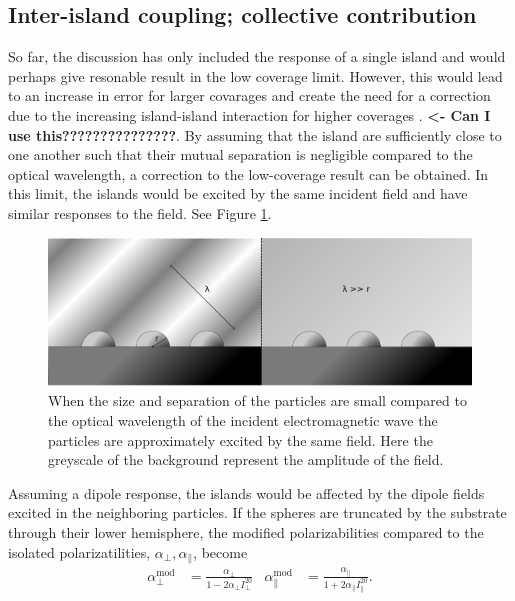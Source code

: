 \subsection{Inter-island coupling; collective contribution}
So far, the discussion has only included the response of a single island and would perhaps 
give resonable result in the low coverage limit. However, this would lead to 
an increase in error for larger covarages and create the need for a correction
due to the increasing island-island interaction for higher coverages
\cite[p.~20]{Lie2010}.
%
\textbf{ <- Can I use this???????????????}.%
%
By assuming that the island are sufficiently close to one another such that their mutual separation is 
negligible compared to the optical wavelength, a correction to the low-coverage result can be obtained. 
In this limit, the islands would be excited by the same incident field and have similar responses
to the field. See Figure \ref{fig:quasiStatic}.
%
\begin{figure}
    \centering
    \includegraphics[width=1.0\textwidth]{Figures/quasiStaticApprox3.pdf}
    \caption{
       When the size and separation of the particles are small compared to the optical wavelength
       of the incident electromagnetic wave the particles are approximately excited by the same field.
       Here the greyscale of the background represent the amplitude of the field.
    }
    \label{fig:quasiStatic}
\end{figure}
%
Assuming a dipole response, the islands would be affected by the dipole
fields excited in the neighboring particles. If the spheres are truncated by the substrate through their
lower hemisphere, the modified polarizabilities compared to the isolated polarizatilities, $\alpha_{\perp},
\alpha_{\parallel}$, become \cite[p.~181]{BedeauxVliegerBook}
\begin{align}
   \alpha^{\text{mod}}_{\perp} &= \frac{\alpha_{\perp}}{ 1 - 2 \alpha_{\perp} I_{\perp}^{20} }
   &\alpha^{\text{mod}}_{\parallel} &= \frac{\alpha_{\parallel}}{ 1 + 2 \alpha_{\parallel} I_{\parallel}^{20}}.
\end{align}
